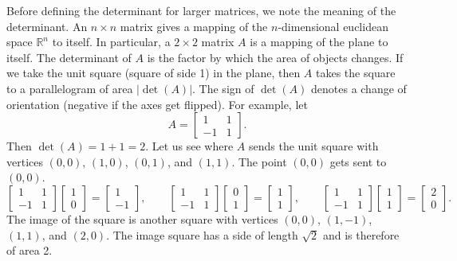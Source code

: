 Before defining the
determinant for larger matrices, we note
the meaning of the determinant.
An $n \times n$ matrix
gives a mapping of the $n$-dimensional euclidean space ${\mathbb{R}}^n$ to 
itself.
In particular, a $2 \times 2$ matrix $A$ is a mapping of
the plane to itself.  The determinant of 
$A$ is the factor by which the area of objects changes. 
If we take the unit square (square of side 1) in the plane, then
$A$ takes the square to a parallelogram of area $\lvert\det(A)\rvert$.  The sign
of $\det(A)$ denotes a change of orientation (negative if the axes get flipped).  For
example, let
\begin{equation*}
A =
\begin{bmatrix}
1 & 1 \\
-1 & 1
\end{bmatrix} .
\end{equation*}
Then $\det(A) = 1+1 = 2$.
Let us see where $A$ sends the unit square with vertices
$(0,0)$, $(1,0)$, $(0,1)$, and $(1,1)$.
The point $(0,0)$ gets sent
to $(0,0)$.  
\begin{equation*}
\begin{bmatrix}
1 & 1 \\
-1 & 1
\end{bmatrix}
\begin{bmatrix}
1 \\ 0
\end{bmatrix} =
\begin{bmatrix}
1 \\
-1 
\end{bmatrix}
,
\qquad
\begin{bmatrix}
1 & 1 \\
-1 & 1
\end{bmatrix}
\begin{bmatrix}
0 \\ 1
\end{bmatrix} =
\begin{bmatrix}
1 \\
1 
\end{bmatrix}
,
\qquad
\begin{bmatrix}
1 & 1 \\
-1 & 1
\end{bmatrix}
\begin{bmatrix}
1 \\ 1
\end{bmatrix} =
\begin{bmatrix}
2 \\
0 
\end{bmatrix}
.
\end{equation*}
The image of the square is another square with vertices $(0,0)$, $(1,-1)$,
$(1,1)$, and $(2,0)$.  The
image square has
a side of length $\sqrt{2}$ and is therefore of area 2.

